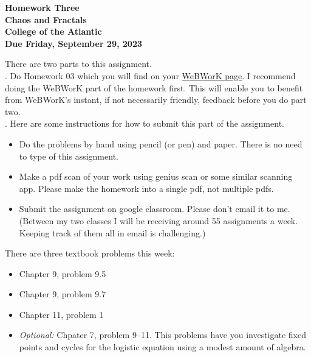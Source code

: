 \documentclass[12pt]{article}
\begin{document}
\pagestyle{empty}
 
\begin{center}
{\LARGE {\bf Homework Three}}\\
\bigskip
{\Large {\bf Chaos and Fractals}}\\
\bigskip
{\Large {\bf College of the Atlantic}}\\
\bigskip
{ {\bf Due Friday, September 29, 2023}}\\  
\end{center}
\medskip


\noindent There are two parts to this assignment.\\

.  Do Homework 03 which you will find
on your
\href{https://webwork-hosting.runestone.academy/webwork2/coa-feldman-es1026i-fall2023}{WeBWorK
  page}.  I recommend doing the WeBWorK part of the 
homework first.  This will enable you to benefit from WeBWorK's
instant, if not necessarily friendly, feedback before you do part two.\\

.  Here are some
instructions for how to submit this part of the assignment.
\begin{itemize}
\item Do the problems by hand using pencil (or pen) and paper.
  There is no need to type of this assignment.
\item Make a pdf scan of your work using genius scan or some
  similar scanning app.  Please make the homework into a single
  pdf, not multiple pdfs.
\item Submit the assignment on google classroom.  Please don't
  email it to me.  (Between my two classes I will be receiving
  around 55 assignments a week.  Keeping track of them all in email
  is challenging.)
\end{itemize}

\noindent There are three textbook problems this week:

\begin{itemize}
\setlength{\itemsep}{-1mm}
\item Chapter 9, problem 9.5
\item Chapter 9, problem 9.7
\item Chapter 11, problem 1
\item \emph{Optional:} Chpater 7, problem 9--11. This problems have
  you investigate fixed points and cycles for the logistic equation
  using a modest amount of algebra. 
\end{itemize}
\end{document}
